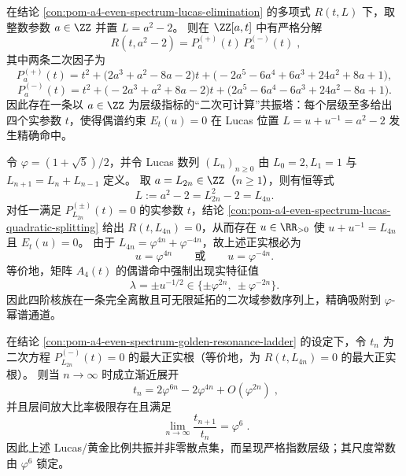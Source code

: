 \begin{conclusion}[整参数子族 \texorpdfstring{$L=a^2-2$}{L=a^2-2} 的完全二次分裂]\label{con:pom-a4-even-spectrum-lucas-quadratic-splitting}
在结论 \ref{con:pom-a4-even-spectrum-lucas-elimination} 的多项式 \(R(t,L)\) 下，取整数参数 \(a\in\ZZ\) 并置 \(L=a^2-2\)。
则在 \(\ZZ[a,t]\) 中有严格分解
\[
\boxed{\;
R(t,a^2-2)=P_a^{(+)}(t)\,P_a^{(-)}(t)\; } ,
\]
其中两条二次因子为
\[
P_a^{(+)}(t)=t^2+\bigl(2a^3+a^2-8a-2\bigr)t+\bigl(-2a^5-6a^4+6a^3+24a^2+8a+1\bigr),
\]
\[
P_a^{(-)}(t)=t^2+\bigl(-2a^3+a^2+8a-2\bigr)t+\bigl(2a^5-6a^4-6a^3+24a^2-8a+1\bigr).
\]
因此存在一条以 \(a\in\ZZ\) 为层级指标的“二次可计算”共振塔：每个层级至多给出四个实参数 \(t\)，使得偶谱约束 \(E_t(u)=0\) 在 Lucas 位置 \(L=u+u^{-1}=a^2-2\) 发生精确命中。
\end{conclusion}

\begin{conclusion}[Lucas 层的黄金比例共振梯：\texorpdfstring{$u=\varphi^{\pm 4n}$}{u=phi^{pm4n}} 的实偶谱命中]\label{con:pom-a4-even-spectrum-golden-resonance-ladder}
令 \(\varphi=(1+\sqrt5)/2\)，并令 Lucas 数列 \((L_n)_{n\ge 0}\) 由 \(L_0=2,L_1=1\) 与 \(L_{n+1}=L_n+L_{n-1}\) 定义。
取 \(a=L_{2n}\in\ZZ\)（\(n\ge 1\)），则有恒等式
\[
L:=a^2-2=L_{2n}^2-2=L_{4n}.
\]
对任一满足 \(P_{L_{2n}}^{(\pm)}(t)=0\) 的实参数 \(t\)，结论 \ref{con:pom-a4-even-spectrum-lucas-quadratic-splitting} 给出 \(R(t,L_{4n})=0\)，从而存在 \(u\in\RR_{>0}\) 使 \(u+u^{-1}=L_{4n}\) 且 \(E_t(u)=0\)。
由于 \(L_{4n}=\varphi^{4n}+\varphi^{-4n}\)，故上述正实根必为
\[
u=\varphi^{4n}\qquad\text{或}\qquad u=\varphi^{-4n}.
\]
等价地，矩阵 \(A_4(t)\) 的偶谱命中强制出现实特征值
\[
\lambda=\pm u^{-1/2}
\in\{\pm\varphi^{2n},\ \pm\varphi^{-2n}\}.
\]
因此四阶核族在一条完全离散且可无限延拓的二次域参数序列上，精确吸附到 \(\varphi\)-幂谱通道。
\end{conclusion}

\begin{conclusion}\label{con:pom-a4-even-spectrum-resonance-scale-law}
在结论 \ref{con:pom-a4-even-spectrum-golden-resonance-ladder} 的设定下，令 \(t_n\) 为二次方程 \(P_{L_{2n}}^{(-)}(t)=0\) 的最大正实根（等价地，为 \(R(t,L_{4n})=0\) 的最大正实根）。
则当 \(n\to\infty\) 时成立渐近展开
\[
\boxed{\;
t_n=2\varphi^{6n}-2\varphi^{4n}+O(\varphi^{2n})\; } ,
\]
并且层间放大比率极限存在且满足
\[
\boxed{\;
\lim_{n\to\infty}\frac{t_{n+1}}{t_n}=\varphi^6\; } .
\]
因此上述 Lucas/黄金比例共振并非零散点集，而呈现严格指数层级；其尺度常数由 \(\varphi^6\) 锁定。
\end{conclusion}

